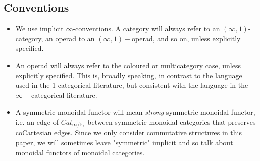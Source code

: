 \subsection{Conventions}
\begin{itemize}
\item We use implicit $\infty$-conventions. A category will always refer to an $(\infty,1)$-category, an operad to an $(\infty,1)-$operad, and so on, unless explicitly specified.
\item An operad will always refer to the coloured or multicategory case, unless explicitly specified. This is, broadly speaking, in contrast to the language used in the 1-categorical literature, but consistent with the language in the $\infty-$categorical literature.
\item A symmetric monoidal functor will mean \textit{strong} symmetric monoidal functor, i.e. an edge of $Cat_{\infty/\mathbb{F}_*}$ between symmetric monoidal categories that preserves coCartesian edges. Since we only consider commutative structures in this paper, we will sometimes leave "symmetric" implicit and so talk about monoidal functors of monoidal categories.
\end{itemize}
